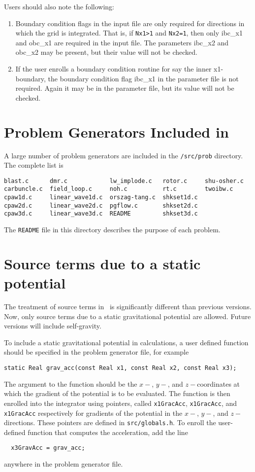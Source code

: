 Users should also note the following:

\begin{enumerate}

\item Boundary condition flags in the input file are only required for 
directions in which the grid is integrated.  That is, if {\tt Nx1>1}
and {\tt Nx2=1}, then only ibc\_x1 and obc\_x1 are required in the
input file.  The parameters ibc\_x2 and obc\_x2 may be present, but
their value will not be checked.

\item If the user enrolls a boundary condition routine for say the inner
x1-boundary, the boundary condition flag ibc\_x1 in the parameter file
is not required.  Again it may be in the parameter file, but its value
will not be checked.

\end{enumerate}

\section{Problem Generators Included in \ath}

A large number of problem generators are included in the {\tt /src/prob}
directory.  The complete list is
\begin{verbatim}
blast.c      dmr.c            lw_implode.c   rotor.c     shu-osher.c
carbuncle.c  field_loop.c     noh.c          rt.c        twoibw.c
cpaw1d.c     linear_wave1d.c  orszag-tang.c  shkset1d.c
cpaw2d.c     linear_wave2d.c  pgflow.c       shkset2d.c
cpaw3d.c     linear_wave3d.c  README         shkset3d.c
\end{verbatim}
The {\tt README} file in this directory describes the purpose of each
problem.

\section{Source terms due to a static potential}

The treatment of source terms in \ath\ is significantly different than
previous versions.  Now, only source terms due to a static gravitational
potential are allowed.  Future versions will include self-gravity.

To include a static gravitational potential in calculations,
a user defined function should be specified in the problem generator file,
for example
\begin{verbatim}
static Real grav_acc(const Real x1, const Real x2, const Real x3);
\end{verbatim}
The argument to the function should be the $x-$, $y-$, and $z-$coordinates
at which the gradient of the potential is to be evaluated.  The function is then enrolled
into the integrator using pointers, called {\tt x1GracAcc}, {\tt x1GracAcc},
and {\tt x1GracAcc} respectively for gradients of the potential in the
$x-$, $y-$, and $z-$directions.  These pointers are defined in
{\tt src/globals.h}.  To enroll the user-defined function that computes
the acceleration, add the line
\begin{verbatim}
  x3GravAcc = grav_acc;
\end{verbatim}
anywhere in the problem generator file.

